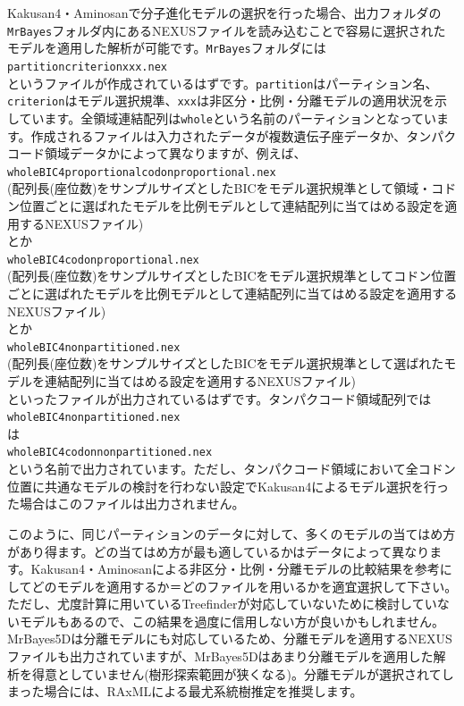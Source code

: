 \documentclass[titlepage,10pt,a4paper]{jsbook}
\begin{document}
Kakusan4・Aminosanで分子進化モデルの選択を行った場合、出力フォルダの\texttt{MrBayes}フォルダ内にあるNEXUSファイルを読み込むことで容易に選択されたモデルを適用した解析が可能です。\texttt{MrBayes}フォルダには\\
\texttt{partition{\textunderscore}criterion{\textunderscore}xxx.nex}\\
というファイルが作成されているはずです。\texttt{partition}はパーティション名、\texttt{criterion}はモデル選択規準、\texttt{xxx}は非区分・比例・分離モデルの適用状況を示しています。全領域連結配列は\texttt{whole}という名前のパーティションとなっています。作成されるファイルは入力されたデータが複数遺伝子座データか、タンパクコード領域データかによって異なりますが、例えば、\\
\texttt{whole{\textunderscore}BIC4{\textunderscore}proportional{\textunderscore}codonproportional.nex}\\
(配列長(座位数)をサンプルサイズとしたBICをモデル選択規準として領域・コドン位置ごとに選ばれたモデルを比例モデルとして連結配列に当てはめる設定を適用するNEXUSファイル)\\
とか\\
\texttt{whole{\textunderscore}BIC4{\textunderscore}codonproportional.nex}\\
(配列長(座位数)をサンプルサイズとしたBICをモデル選択規準としてコドン位置ごとに選ばれたモデルを比例モデルとして連結配列に当てはめる設定を適用するNEXUSファイル)\\
とか\\
\texttt{whole{\textunderscore}BIC4{\textunderscore}nonpartitioned.nex}\\
(配列長(座位数)をサンプルサイズとしたBICをモデル選択規準として選ばれたモデルを連結配列に当てはめる設定を適用するNEXUSファイル)\\
といったファイルが出力されているはずです。タンパクコード領域配列では\\
\texttt{whole{\textunderscore}BIC4{\textunderscore}nonpartitioned.nex}\\
は\\
\texttt{whole{\textunderscore}BIC4{\textunderscore}codonnonpartitioned.nex}\\
という名前で出力されています。ただし、タンパクコード領域において全コドン位置に共通なモデルの検討を行わない設定でKakusan4によるモデル選択を行った場合はこのファイルは出力されません。

このように、同じパーティションのデータに対して、多くのモデルの当てはめ方があり得ます。どの当てはめ方が最も適しているかはデータによって異なります。Kakusan4・Aminosanによる非区分・比例・分離モデルの比較結果を参考にしてどのモデルを適用するか＝どのファイルを用いるかを適宜選択して下さい。ただし、尤度計算に用いているTreefinderが対応していないために検討していないモデルもあるので、この結果を過度に信用しない方が良いかもしれません。MrBayes5Dは分離モデルにも対応しているため、分離モデルを適用するNEXUSファイルも出力されていますが、MrBayes5Dはあまり分離モデルを適用した解析を得意としていません(樹形探索範囲が狭くなる)。分離モデルが選択されてしまった場合には、RAxMLによる最尤系統樹推定を推奨します。
\end{document}
